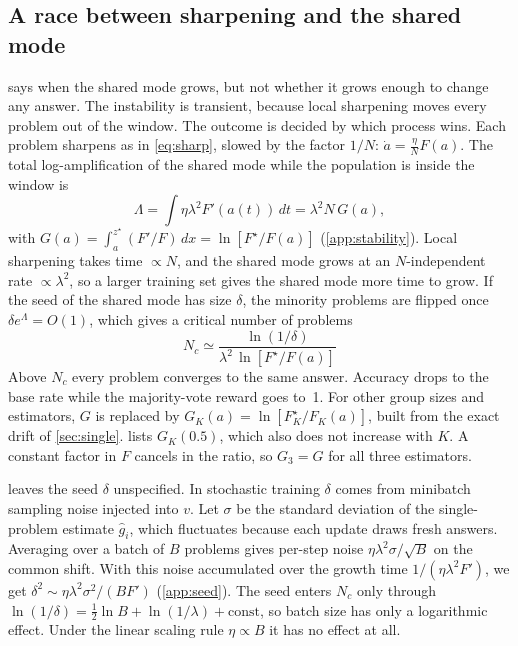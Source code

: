 \subsection{A race between sharpening and the shared mode}
\label{sec:race}
 says when the shared mode grows, but not whether it grows enough to change any answer.
The instability is transient, because local sharpening moves every problem out of the window.
The outcome is decided by which process wins.
Each problem sharpens as in \cref{eq:sharp}, slowed by the factor $1/N$: $\dot a=\frac{\eta}{N}F(a)$. The total log-amplification of the shared mode while the population is inside the window is
\begin{equation}
  \Lambda=\int\!\eta\lambda^2F'(a(t))\,dt=\lambda^2N\,G(a),
  \label{eq:Lambda}
\end{equation}
with $G(a)=\int_a^{z^\star}(F'/F)\,dx=\ln[F^\star/F(a)]$ (\cref{app:stability}).
Local sharpening takes time $\propto N$, and the shared mode grows at an $N$-independent rate $\propto\lambda^2$, so a larger training set gives the shared mode more time to grow.
If the seed of the shared mode has size $\delta$, the minority problems are flipped once $\delta e^{\Lambda}=O(1)$, which gives a critical number of problems
\begin{equation}
  \boxed{N_c\simeq\frac{\ln(1/\delta)}{\lambda^2\,\ln[F^\star/F(a)]}}
  \label{eq:Nc}
\end{equation}
Above $N_c$ every problem converges to the same answer. Accuracy drops to the base rate while the majority-vote reward goes to~1.
For other group sizes and estimators, $G$ is replaced by $G_K(a)=\ln[F^\star_K/F_K(a)]$, built from the exact drift of \cref{sec:single}.  lists $G_K(0.5)$, which also does not increase with $K$. A constant factor in $F$ cancels in the ratio, so $G_3=G$ for all three estimators.

 leaves the seed $\delta$ unspecified.
In stochastic training $\delta$ comes from minibatch sampling noise injected into $v$.
Let $\sigma$ be the standard deviation of the single-problem estimate $\hat g_i$, which fluctuates because each update draws fresh answers. Averaging over a batch of $B$ problems gives per-step noise $\eta\lambda^2\sigma/\sqrt B$ on the common shift. With this noise accumulated over the growth time $1/(\eta\lambda^2F')$, we get $\delta^2\sim\eta\lambda^2\sigma^2/(BF')$ (\cref{app:seed}).
The seed enters $N_c$ only through $\ln(1/\delta)=\tfrac12\ln B+\ln(1/\lambda)+\text{const}$, so batch size has only a logarithmic effect. Under the linear scaling rule $\eta\propto B$ it has no effect at all.

